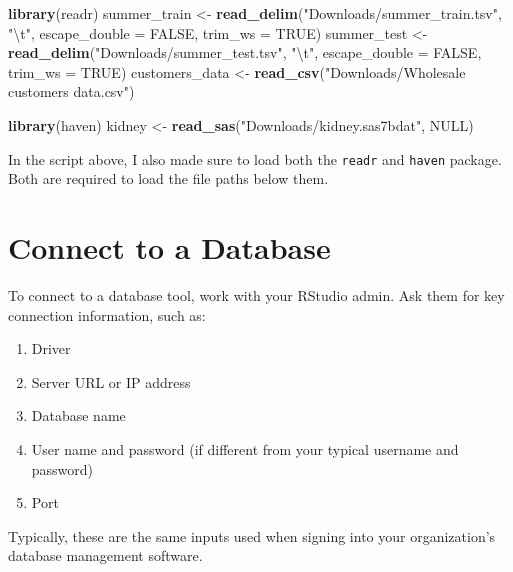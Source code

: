 \documentclass[
]{book}
\newenvironment{Shaded}{\begin{snugshade}}{\end{snugshade}}
\newcommand{\CharTok}[1]{\textcolor[rgb]{0.31,0.60,0.02}{#1}}
\newcommand{\DataTypeTok}[1]{\textcolor[rgb]{0.13,0.29,0.53}{#1}}
\newcommand{\KeywordTok}[1]{\textcolor[rgb]{0.13,0.29,0.53}{\textbf{#1}}}
\newcommand{\NormalTok}[1]{#1}
\newcommand{\OtherTok}[1]{\textcolor[rgb]{0.56,0.35,0.01}{#1}}
\newcommand{\StringTok}[1]{\textcolor[rgb]{0.31,0.60,0.02}{#1}}
\providecommand{\tightlist}{%
  \setlength{\itemsep}{0pt}\setlength{\parskip}{0pt}}
\begin{document}
\begin{center}
\begin{Shaded}
\begin{Highlighting}[]
\KeywordTok{library}\NormalTok{(readr)}
\NormalTok{summer_train <-}\StringTok{ }\KeywordTok{read_delim}\NormalTok{(}\StringTok{"Downloads/summer_train.tsv"}\NormalTok{, }\StringTok{"}\CharTok{\textbackslash{}t}\StringTok{"}\NormalTok{, }\DataTypeTok{escape_double =} \OtherTok{FALSE}\NormalTok{, }\DataTypeTok{trim_ws =} \OtherTok{TRUE}\NormalTok{)}
\NormalTok{summer_test <-}\StringTok{ }\KeywordTok{read_delim}\NormalTok{(}\StringTok{"Downloads/summer_test.tsv"}\NormalTok{, }\StringTok{"}\CharTok{\textbackslash{}t}\StringTok{"}\NormalTok{, }\DataTypeTok{escape_double =} \OtherTok{FALSE}\NormalTok{, }\DataTypeTok{trim_ws =} \OtherTok{TRUE}\NormalTok{)}
\NormalTok{customers_data <-}\StringTok{ }\KeywordTok{read_csv}\NormalTok{(}\StringTok{"Downloads/Wholesale customers data.csv"}\NormalTok{)}

\KeywordTok{library}\NormalTok{(haven)}
\NormalTok{kidney <-}\StringTok{ }\KeywordTok{read_sas}\NormalTok{(}\StringTok{"Downloads/kidney.sas7bdat"}\NormalTok{, }\OtherTok{NULL}\NormalTok{)}
\end{Highlighting}
\end{Shaded}

In the script above, I also made sure to load both the \texttt{readr} and \texttt{haven} package. Both are required to load the file paths below them.

\hypertarget{connect-to-a-database}{%
\section{Connect to a Database}\label{connect-to-a-database}}

To connect to a database tool, work with your RStudio admin. Ask them for key connection information, such as:

\begin{enumerate}
\def\labelenumi{\arabic{enumi}.}
\tightlist
\item
  Driver
\item
  Server URL or IP address
\item
  Database name
\item
  User name and password (if different from your typical username and password)
\item
  Port
\end{enumerate}

Typically, these are the same inputs used when signing into your organization's database management software.


\end{center}
\end{document}
